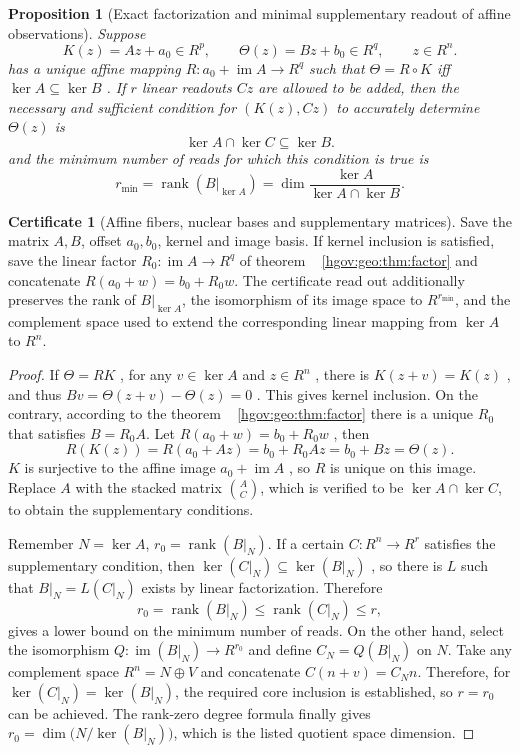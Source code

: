 \documentclass[12pt,a4paper,openany,notitlepage]{report}
\theoremstyle{plain}
\newtheorem{proposition}[theorem]{Proposition}
\theoremstyle{definition}
\newtheorem*{certificate}{Certificate}
\theoremstyle{remark}
\def\mathcal#1{#1}\def\mathsf#1{#1}\def\mathbb#1{#1}%
\begin{document}
\begin{CJK*}
\begin{proposition}
[Exact factorization and minimal supplementary readout of affine observations]\label{exp:geo:prop:affine-factorization}
Suppose \[
\mathcal K(z)=Az+a_0\in\mathbb R^p,
\qquad
\Theta(z)=Bz+b_0\in\mathbb R^q,
\qquad z\in\mathbb R^n.
\] has a unique affine mapping $R:a_0+\operatorname{im}A\to\mathbb R^q$ such that $\Theta=R\circ\mathcal K$ iff $\ker A\subseteq\ker B$ . If $r$ linear readouts $Cz$ are allowed to be added, then the necessary and sufficient condition for $(\mathcal K(z),Cz)$ to accurately determine $\Theta(z)$ is \[
\ker A\cap\ker C\subseteq\ker B.
\] and the minimum number of reads for which this condition is true is \[
r_{\min}=\operatorname{rank}(B|_{\ker A})
=\dim\frac{\ker A}{\ker A\cap\ker B}.
\]\end{proposition}
\begin{certificate}
[Affine fibers, nuclear bases and supplementary matrices]Save the matrix $A,B$, offset $a_0,b_0$, kernel and image basis. If kernel inclusion is satisfied, save the linear factor $R_0:\operatorname{im}A\to\mathbb R^q$ of theorem ~ \ref{hgov:geo:thm:factor} and concatenate $R(a_0+w)=b_0+R_0w$. The certificate read out additionally preserves the rank of $B|_{\ker A}$, the isomorphism of its image space to $\mathbb R^{r_{\min}}$, and the complement space used to extend the corresponding linear mapping from $\ker A$ to $\mathbb R^n$.\end{certificate}
\begin{proof}
If $\Theta=R\mathcal K$ , for any $v\in\ker A$ and $z\in\mathbb R^n$ , there is $\mathcal K(z+v)=\mathcal K(z)$ , and thus $Bv=\Theta(z+v)-\Theta(z)=0$ . This gives kernel inclusion. On the contrary, according to the theorem ~ \ref{hgov:geo:thm:factor} there is a unique $R_0$ that satisfies $B=R_0A$. Let $R(a_0+w)=b_0+R_0w$ , then \[
R(\mathcal K(z))=R(a_0+Az)=b_0+R_0Az=b_0+Bz=\Theta(z).
\] $\mathcal K$ is surjective to the affine image $a_0+\operatorname{im}A$ , so $R$ is unique on this image. Replace $A$ with the stacked matrix $\binom AC$, which is verified to be $\ker A\cap\ker C$, to obtain the supplementary conditions.

Remember $N=\ker A$, $r_0=\operatorname{rank}(B|_N)$. If a certain $C:\mathbb R^n\to\mathbb R^r$ satisfies the supplementary condition, then $\ker(C|_N)\subseteq\ker(B|_N)$ , so there is $L$ such that $B|_N=L(C|_N)$ exists by linear factorization. Therefore \[
r_0=\operatorname{rank}(B|_N)
\le\operatorname{rank}(C|_N)\le r,
\] gives a lower bound on the minimum number of reads. On the other hand, select the isomorphism $Q:\operatorname{im}(B|_N)\to\mathbb R^{r_0}$ and define $C_N=Q(B|_N)$ on $N$. Take any complement space $\mathbb R^n=N\oplus V$ and concatenate $C(n+v)=C_Nn$. Therefore, for $\ker(C|_N)=\ker(B|_N)$, the required core inclusion is established, so $r=r_0$ can be achieved. The rank-zero degree formula finally gives $r_0=\dim\bigl(N/\ker(B|_N)\bigr)$, which is the listed quotient space dimension.\end{proof}



\end{CJK*}
\end{document}

